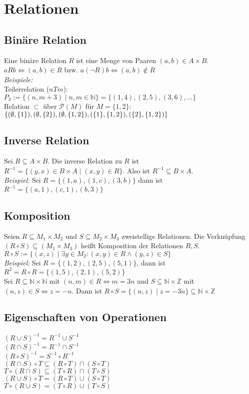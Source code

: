 \section{Relationen}
\subsection*{Binäre Relation}
Eine binäre Relation $R$ ist eine Menge von Paaren $(a,b)\in A\times B$.\\
$aRb\Leftrightarrow (a,b)\in R$ bzw. $a(\neg R)b\Leftrightarrow (a,b)\notin R$\\
\emph{Beispiele:}\\
Teilerrelation ($nTm$): $P_3:=\{(n,m+3)\mid n,m\in\mathbb{N}\}=\{(1,4),(2,5),(3,6),...\}$\\
Relation $\subset$ über $\mathcal{P}(M)$ für $M=\{1,2\}$:\\
$\{(\emptyset ,\{1\}),(\emptyset ,\{2\}),(\emptyset ,\{1,2\}),(\{1\},\{1,2\}),\\(\{2\} ,\{1,2\})\}$
\subsection*{Inverse Relation}
Sei $R\subseteq A\times B$. Die inverse Relation zu $R$ ist $R^{-1}=\{(y,x)\in B\times A\mid (x,y)\in R\}$. Also ist $R^{-1}\subseteq B\times A$.\\
\emph{Beispiel:} Sei $R=\{(1,a),(1,c),(3,b)\}$ dann ist $R^{-1}=\{(a,1),(c,1),(b,3)\}$
\subsection*{Komposition}
Seien $R\subseteq M_1\times M_2$ und $S\subseteq M_2\times M_3$ zweistellige Relationen.
Die Verknüpfung $(R\circ S)\subseteq (M_1\times M_3)$ heißt Komposition der Relationen $R,S$.\\
$R\circ S:=\{(x,z)\mid\exists y\in M_2:(x,y)\in R\wedge (y,z)\in S\}$\\
\emph{Beispiel:} Sei $R=\{(1,2),(2,5),(5,1)\}$, dann ist $R^2=R\circ R=\{(1,5),(2,1),(5,2)\}$\\
Sei $R\subseteq\mathbb{N}\times\mathbb{N}$ mit $(n,m)\in R\Leftrightarrow m=3n$ und
$S\subseteq\mathbb{N}\times\mathbb{Z}$ mit $(n,z)\in S\Leftrightarrow z=-n$. Dann ist $R\circ S=\{(n,z)\mid z=-3n\}\subseteq\mathbb{N}\times\mathbb{Z}$
\subsection*{Eigenschaften von Operationen}
$(R\cup S)^{-1}=R^{-1}\cup S^{-1}$\\
$(R\cap S)^{-1}=R^{-1}\cap S^{-1}$\\
$(R\circ S)^{-1}=S^{-1}\circ R^{-1}$\\
$(R\cap S)\circ T\subseteq (R\circ T)\cap (S\circ T)$\\
$T\circ (R\cap S)\subseteq (T\circ R)\cap (T\circ S)$\\
$(R\cup S)\circ T = (R\circ T)\cup (S\circ T)$\\
$T\circ (R\cup S) = (T\circ R)\cup (T\circ S)$
